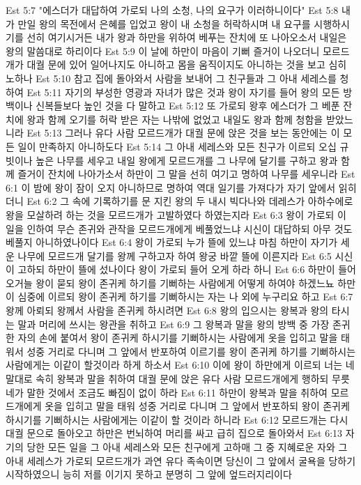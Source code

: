 Est 5:7  "에스더가 대답하여 가로되 나의 소청, 나의 요구가 이러하니이다"
Est 5:8  내가 만일 왕의 목전에서 은혜를 입었고 왕이 내 소청을 허락하시며 내 요구를 시행하시기를 선히 여기시거든 내가 왕과 하만을 위하여 베푸는 잔치에 또 나아오소서 내일은 왕의 말씀대로 하리이다
Est 5:9  이 날에 하만이 마음이 기뻐 즐거이 나오더니 모르드개가 대궐 문에 있어 일어나지도 아니하고 몸을 움직이지도 아니하는 것을 보고 심히 노하나
Est 5:10  참고 집에 돌아와서 사람을 보내어 그 친구들과 그 아내 세레스를 청하여
Est 5:11  자기의 부성한 영광과 자녀가 많은 것과 왕이 자기를 들어 왕의 모든 방백이나 신복들보다 높인 것을 다 말하고
Est 5:12  또 가로되 왕후 에스더가 그 베푼 잔치에 왕과 함께 오기를 허락 받은 자는 나밖에 없었고 내일도 왕과 함께 청함을 받았느니라
Est 5:13  그러나 유다 사람 모르드개가 대궐 문에 앉은 것을 보는 동안에는 이 모든 일이 만족하지 아니하도다
Est 5:14  그 아내 세레스와 모든 친구가 이르되 오십 규빗이나 높은 나무를 세우고 내일 왕에게 모르드개를 그 나무에 달기를 구하고 왕과 함께 즐거이 잔치에 나아가소서 하만이 그 말을 선히 여기고 명하여 나무를 세우니라
Est 6:1  이 밤에 왕이 잠이 오지 아니하므로 명하여 역대 일기를 가져다가 자기 앞에서 읽히더니
Est 6:2  그 속에 기록하기를 문 지킨 왕의 두 내시 빅다나와 데레스가 아하수에로왕을 모살하려 하는 것을 모르드개가 고발하였다 하였는지라
Est 6:3  왕이 가로되 이 일을 인하여 무슨 존귀와 관작을 모르드개에게 베풀었느냐 시신이 대답하되 아무 것도 베풀지 아니하였나이다
Est 6:4  왕이 가로되 누가 뜰에 있느냐 마침 하만이 자기가 세운 나무에 모르드개 달기를 왕께 구하고자 하여 왕궁 바깥 뜰에 이른지라
Est 6:5  시신이 고하되 하만이 뜰에 섰나이다 왕이 가로되 들어 오게 하라 하니
Est 6:6  하만이 들어오거늘 왕이 묻되 왕이 존귀케 하기를 기뻐하는 사람에게 어떻게 하여야 하겠느뇨 하만이 심중에 이르되 왕이 존귀케 하기를 기뻐하시는 자는 나 외에 누구리요 하고
Est 6:7  왕께 아뢰되 왕께서 사람을 존귀케 하시려면
Est 6:8  왕의 입으시는 왕복과 왕의 타시는 말과 머리에 쓰시는 왕관을 취하고
Est 6:9  그 왕복과 말을 왕의 방백 중 가장 존귀한 자의 손에 붙여서 왕이 존귀케 하시기를 기뻐하시는 사람에게 옷을 입히고 말을 태워서 성중 거리로 다니며 그 앞에서 반포하여 이르기를 왕이 존귀케 하기를 기뻐하시는 사람에게는 이같이 할것이라 하게 하소서
Est 6:10  이에 왕이 하만에게 이르되 너는 네 말대로 속히 왕복과 말을 취하여 대궐 문에 앉은 유다 사람 모르드개에게 행하되 무릇 네가 말한 것에서 조금도 빠짐이 없이 하라
Est 6:11  하만이 왕복과 말을 취하여 모르드개에게 옷을 입히고 말을 태워 성중 거리로 다니며 그 앞에서 반포하되 왕이 존귀케 하시기를 기뻐하시는 사람에게는 이같이 할 것이라 하니라
Est 6:12  모르드개는 다시 대궐 문으로 돌아오고 하만은 번뇌하여 머리를 싸고 급히 집으로 돌아와서
Est 6:13  자기의 당한 모든 일을 그 아내 세레스와 모든 친구에게 고하매 그 중 지혜로운 자와 그 아내 세레스가 가로되 모르드개가 과연 유다 족속이면 당신이 그 앞에서 굴욕을 당하기 시작하였으니 능히 저를 이기지 못하고 분명히 그 앞에 엎드러지리이다
